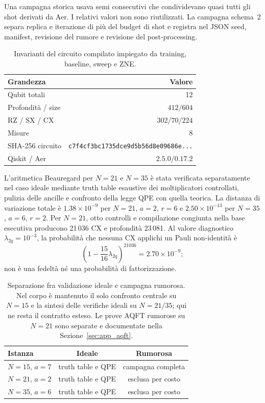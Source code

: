 \begin{onehalfspace}
Una campagna storica usava semi consecutivi che condividevano quasi tutti
gli shot derivati da Aer. I relativi valori non sono riutilizzati. La
campagna schema~2 separa replica e iterazione di più del budget di shot e
registra nel JSON seed, manifest, revisione del rumore e revisione del
post-processing.

\begin{table}[H]
\centering
\caption[Contratto riproducibile della campagna N=15]{Invarianti del
circuito compilato impiegato da training, baseline, sweep e ZNE.}
\label{tab:correzione_seed}
\label{tab:circuit_depth}
\begin{tabular}{lr}
\toprule
\textbf{Grandezza} & \textbf{Valore} \\
\midrule
Qubit totali & 12 \\
Profondità / size & $412/604$ \\
RZ / SX / CX & $302/70/224$ \\
Misure & 8 \\
SHA-256 circuito & \texttt{c7f4cf3bc1735dce9d5b56d8e09686e...} \\
Qiskit / Aer & $2.5.0/0.17.2$ \\
\bottomrule
\end{tabular}
\end{table}

L'aritmetica Beauregard per $N=21$ e $N=35$ è stata verificata
separatamente nel caso ideale mediante truth table esaustive dei
moltiplicatori controllati, pulizia delle ancille e confronto della legge
QPE con quella teorica. La distanza di variazione totale è
$1.38\times10^{-9}$ per $N=21$, $a=2$, $r=6$ e
$2.50\times10^{-13}$ per $N=35$, $a=6$, $r=2$. Per $N=21$, otto
controlli e compilazione congiunta nella base esecutiva producono 21\,036
CX e profondità 23\,081. Al valore diagnostico
$\lambda_{2q}=10^{-3}$, la probabilità che nessuna CX applichi un Pauli
non-identità è
\[
  \left(1-\frac{15}{16}\lambda_{2q}\right)^{21036}
  =2.70\times10^{-9};
\]
non è una fedeltà né una probabilità di fattorizzazione.

\begin{table}[H]
\centering
\caption[Perimetro delle validazioni]{Separazione fra validazione ideale
e campagna rumorosa. Nel corpo è mantenuto il solo confronto centrale su
$N=15$ e la sintesi delle verifiche ideali su $N=21/35$; qui ne resta
il contratto esteso. Le prove AQFT rumorose su $N=21$ sono separate
e documentate nella Sezione~\ref{sec:app_aqft}.}
\label{tab:costo_simulazione}
\begin{tabular}{lcc}
\toprule
\textbf{Istanza} & \textbf{Ideale} & \textbf{Rumorosa} \\
\midrule
$N=15$, $a=7$ & truth table e QPE & campagna completa \\
$N=21$, $a=2$ & truth table e QPE & esclusa per costo \\
$N=35$, $a=6$ & truth table e QPE & esclusa per costo \\
\bottomrule
\end{tabular}
\end{table}


\end{onehalfspace}

